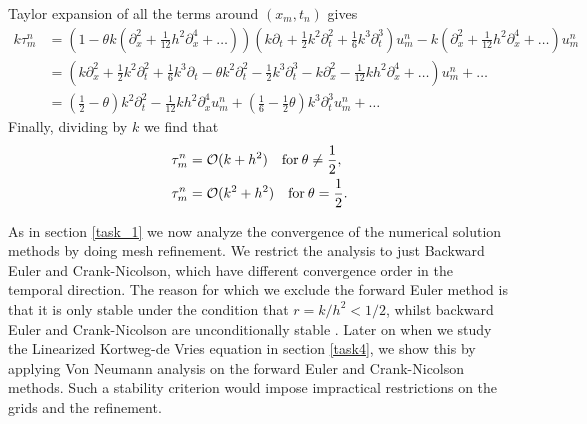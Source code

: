 Taylor expansion of all the terms around $(x_m, t_n)$ gives
\begin{align*}
    k\tau_m^n & = \left(1-\theta k(\partial_x^2+\frac{1}{12}h^2\partial_x^4+\dots) \right)
    \left(k\partial_t+\frac{1}{2}k^2\partial_t^2+\frac{1}{6}k^3\partial_t^3\right)u_m^n
    -k\left(\partial_x^2+\frac{1}{12}h^2\partial_x^4+\dots\right)u_m^n\\
    & = \left(k\partial_x^2+\frac{1}{2}k^2\partial_t^2+\frac{1}{6}k^3\partial_t
    -\theta k^2 \partial_t^2 - \frac{1}{2} k^3 \partial_t^3 - k \partial_x^2 - \frac{1}{12} kh^2 \partial_x^4 + \dots \right)u_m^n + \dots\\
    & = (\frac{1}{2}-\theta)k^2\partial_t^2-\frac{1}{12}kh^2\partial_x^4u_m^n+(\frac{1}{6}-\frac{1}{2}\theta)k^3\partial_t^3u_m^n+\dots
\end{align*}
Finally, dividing by $k$ we find that 
\begin{align*}
    \tau_m^n & = \mathcal{O}(k+h^2) \quad \text{for} \: \theta\neq\frac{1}{2},\\
    \tau_m^n & = \mathcal{O}(k^2+h^2) \quad \text{for} \: \theta = \frac{1}{2}.
\end{align*}

As in section \ref{task_1} we now analyze the convergence of the numerical solution methods 
by doing mesh refinement. 
We restrict the analysis to just Backward Euler and Crank-Nicolson, 
which have different convergence order in the temporal direction. 
The reason for which we exclude the forward Euler method is that it is only stable under the condition that $r=k/h^2 < 1/2$, 
whilst backward Euler and Crank-Nicolson are unconditionally stable \cite{owren}. 
Later on when we study the Linearized Kortweg-de Vries equation in section \ref{task4}, 
we show this by applying Von Neumann analysis on the forward Euler and Crank-Nicolson methods. 
Such a stability criterion would impose impractical restrictions on the grids and the refinement. 

